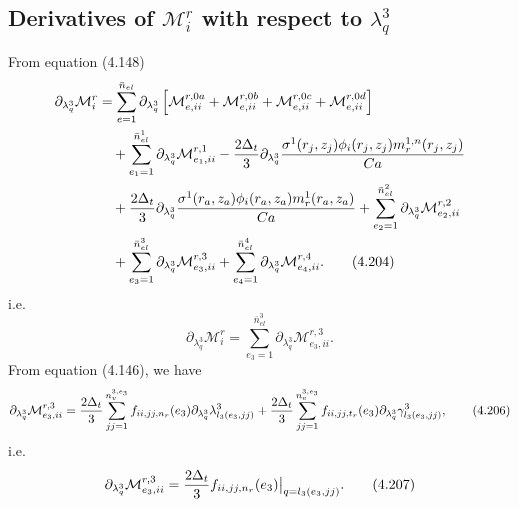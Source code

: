 \documentclass{article}
\begin{document}
\subsection{Derivatives of $\mathcal{M}_i^r$ with respect to $\lambda_q^3$} %
From equation (4.148)
\begin{align}
\partial_{\lambda_q^3}\mathcal{M}_i^r &= \sum_{e=1}^{\bar{n}_{el}} \partial_{\lambda_q^3} \left[ \mathcal{M}_{e,ii}^{r,0a} + \mathcal{M}_{e,ii}^{r,0b} + \mathcal{M}_{e,ii}^{r,0c} + \mathcal{M}_{e,ii}^{r,0d} \right] \nonumber\\
&\quad + \sum_{e_1=1}^{\bar{n}_{el}^1} \partial_{\lambda_q^3} \mathcal{M}_{e_1,ii}^{r,1} 
- \frac{2\Delta_t}{3} \partial_{\lambda_q^3} \frac{\sigma^1(r_j,z_j) \phi_i(r_j,z_j) m_r^{1,n}(r_j,z_j)}{Ca} \nonumber\\
&\quad + \frac{2\Delta_t}{3} \partial_{\lambda_q^3} \frac{\sigma^1(r_a,z_a) \phi_i(r_a,z_a) m_r^{1}(r_a,z_a)}{Ca} 
+ \sum_{e_2=1}^{\bar{n}_{el}^2} \partial_{\lambda_q^3} \mathcal{M}_{e_2,ii}^{r,2} \nonumber\\
&\quad + \sum_{e_3=1}^{\bar{n}_{el}^3} \partial_{\lambda_q^3} \mathcal{M}_{e_3,ii}^{r,3} 
+ \sum_{e_4=1}^{\bar{n}_{el}^4} \partial_{\lambda_q^3} \mathcal{M}_{e_4,ii}^{r,4}. \tag{4.204}
\end{align}
i.e.
\begin{equation}
\partial_{\lambda_q^3}\mathcal{M}_i^r = \sum_{e_3=1}^{\bar{n}_{el}^3} \partial_{\lambda_q^3} \mathcal{M}_{e_3,ii}^{r,3}. \tag{4.205}
\end{equation}
From equation (4.146), we have
\begin{equation}
\partial_{\lambda_q^3}\mathcal{M}_{e_3,ii}^{r,3} = \frac{2\Delta_t}{3} \sum_{jj=1}^{n_v^{3,e_3}} f_{ii,jj,n_r}(e_3) \partial_{\lambda_q^3} \lambda_{l_3(e_3,jj)}^3 
+ \frac{2\Delta_t}{3} \sum_{jj=1}^{n_v^{3,e_3}} f_{ii,jj,t_r}(e_3) \partial_{\lambda_q^3} \gamma_{l_3(e_3,jj)}^3, \tag{4.206}
\end{equation}
i.e.
\begin{equation}
\partial_{\lambda_q^3}\mathcal{M}_{e_3,ii}^{r,3} = \frac{2\Delta_t}{3} f_{ii,jj,n_r}(e_3) \big|_{q=l_3(e_3,jj)}. \tag{4.207}
\end{equation}
\end{document}

